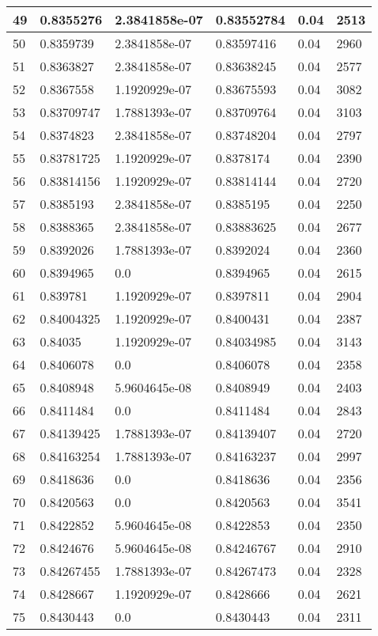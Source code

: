 \begin{longtable}{|l|l|l|l|l|l|}
49 & 0.8355276 & 2.3841858e-07 & 0.83552784 & 0.04 & 2513 \\ \hline 
50 & 0.8359739 & 2.3841858e-07 & 0.83597416 & 0.04 & 2960 \\ \hline 
51 & 0.8363827 & 2.3841858e-07 & 0.83638245 & 0.04 & 2577 \\ \hline 
52 & 0.8367558 & 1.1920929e-07 & 0.83675593 & 0.04 & 3082 \\ \hline 
53 & 0.83709747 & 1.7881393e-07 & 0.83709764 & 0.04 & 3103 \\ \hline 
54 & 0.8374823 & 2.3841858e-07 & 0.83748204 & 0.04 & 2797 \\ \hline 
55 & 0.83781725 & 1.1920929e-07 & 0.8378174 & 0.04 & 2390 \\ \hline 
56 & 0.83814156 & 1.1920929e-07 & 0.83814144 & 0.04 & 2720 \\ \hline 
57 & 0.8385193 & 2.3841858e-07 & 0.8385195 & 0.04 & 2250 \\ \hline 
58 & 0.8388365 & 2.3841858e-07 & 0.83883625 & 0.04 & 2677 \\ \hline 
59 & 0.8392026 & 1.7881393e-07 & 0.8392024 & 0.04 & 2360 \\ \hline 
60 & 0.8394965 & 0.0 & 0.8394965 & 0.04 & 2615 \\ \hline 
61 & 0.839781 & 1.1920929e-07 & 0.8397811 & 0.04 & 2904 \\ \hline 
62 & 0.84004325 & 1.1920929e-07 & 0.8400431 & 0.04 & 2387 \\ \hline 
63 & 0.84035 & 1.1920929e-07 & 0.84034985 & 0.04 & 3143 \\ \hline 
64 & 0.8406078 & 0.0 & 0.8406078 & 0.04 & 2358 \\ \hline 
65 & 0.8408948 & 5.9604645e-08 & 0.8408949 & 0.04 & 2403 \\ \hline 
66 & 0.8411484 & 0.0 & 0.8411484 & 0.04 & 2843 \\ \hline 
67 & 0.84139425 & 1.7881393e-07 & 0.84139407 & 0.04 & 2720 \\ \hline 
68 & 0.84163254 & 1.7881393e-07 & 0.84163237 & 0.04 & 2997 \\ \hline 
69 & 0.8418636 & 0.0 & 0.8418636 & 0.04 & 2356 \\ \hline 
70 & 0.8420563 & 0.0 & 0.8420563 & 0.04 & 3541 \\ \hline 
71 & 0.8422852 & 5.9604645e-08 & 0.8422853 & 0.04 & 2350 \\ \hline 
72 & 0.8424676 & 5.9604645e-08 & 0.84246767 & 0.04 & 2910 \\ \hline 
73 & 0.84267455 & 1.7881393e-07 & 0.84267473 & 0.04 & 2328 \\ \hline 
74 & 0.8428667 & 1.1920929e-07 & 0.8428666 & 0.04 & 2621 \\ \hline 
75 & 0.8430443 & 0.0 & 0.8430443 & 0.04 & 2311 \\ \hline 
\end{longtable}